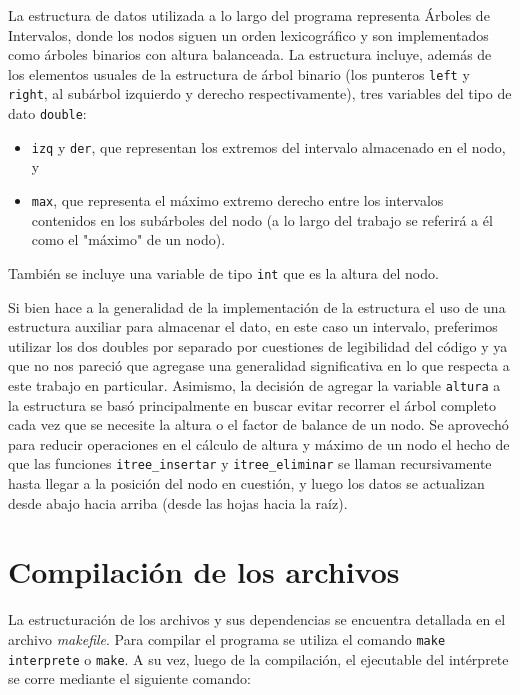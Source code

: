 \documentclass[11pt]{article}
\begin{document}
 La estructura de datos utilizada a lo largo del programa representa Árboles de Intervalos, donde los nodos siguen un orden lexicográfico y son implementados como árboles binarios con altura balanceada.
 La estructura incluye, además de los elementos usuales de la estructura de árbol binario (los punteros \verb|left| y \verb|right|, al subárbol izquierdo y derecho respectivamente), 
 tres variables del tipo de dato \verb|double|:
 \begin{itemize}
     \item \verb|izq| y \verb|der|, que representan los extremos del intervalo almacenado en el nodo, y
     \item \verb|max|, que representa el máximo extremo derecho entre los intervalos contenidos en los subárboles del nodo (a lo largo del trabajo se referirá a él como el "máximo" de un nodo).
 \end{itemize}
 También se incluye una variable de tipo \verb|int| que es la altura del nodo.\par
 
 Si bien hace a la generalidad de la implementación de la estructura el uso de una estructura auxiliar para almacenar el dato, en este caso un intervalo, preferimos utilizar los dos doubles por separado por cuestiones de legibilidad del código y ya que no nos pareció que agregase una generalidad significativa en lo que respecta a este trabajo en particular.
 Asimismo, la decisión de agregar la variable \verb|altura| a la estructura se basó principalmente en buscar evitar recorrer el árbol completo cada vez que se necesite la altura o el factor de balance de un nodo. Se aprovechó para reducir operaciones en el cálculo de altura y máximo de un nodo el hecho de que las funciones \verb|itree_insertar| y \verb|itree_eliminar| se llaman recursivamente hasta llegar a la posición del nodo en cuestión, y luego los datos se actualizan desde abajo hacia arriba (desde las hojas hacia la raíz). \par
 
 
 \section{Compilación de los archivos}
 
 La estructuración de los archivos y sus dependencias se encuentra detallada en el archivo \textit{makefile}. 
 Para compilar el programa se utiliza el comando \verb|make interprete| o \verb|make|. A su vez, luego de la compilación, el ejecutable del intérprete se corre mediante el siguiente comando:\par
 
\end{document}
